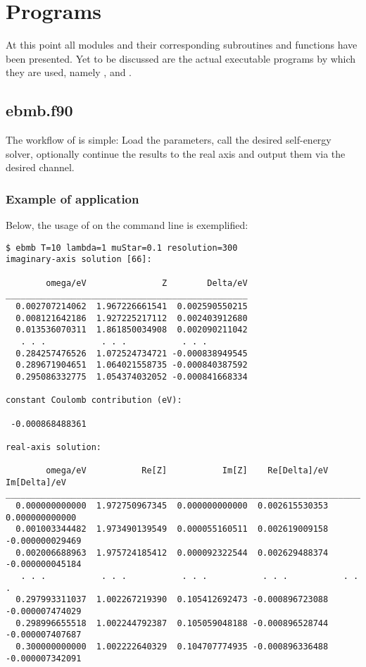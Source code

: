 

\section{Programs}

At this point all modules and their corresponding subroutines and functions have
been presented. Yet to be discussed are the actual executable programs by which
they are used, namely ,  and .

\subsection{ebmb.f90}

The workflow of  is simple: Load the parameters, call the desired
self-energy solver, optionally continue the results to the real axis and output
them via the desired channel.



\subsubsection{Example of application}

Below, the usage of  on the command line is exemplified:
%
\begin{verbatim}
$ ebmb T=10 lambda=1 muStar=0.1 resolution=300
imaginary-axis solution [66]:

        omega/eV               Z        Delta/eV
________________________________________________
  0.002707214062  1.967226661541  0.002590550215
  0.008121642186  1.927225217112  0.002403912680
  0.013536070311  1.861850034908  0.002090211042
   . . .           . . .           . . .
  0.284257476526  1.072524734721 -0.000838949545
  0.289671904651  1.064021558735 -0.000840387592
  0.295086332775  1.054374032052 -0.000841668334

constant Coulomb contribution (eV):

 -0.000868488361

real-axis solution:

        omega/eV           Re[Z]           Im[Z]    Re[Delta]/eV    Im[Delta]/eV
________________________________________________________________________________
  0.000000000000  1.972750967345  0.000000000000  0.002615530353  0.000000000000
  0.001003344482  1.973490139549  0.000055160511  0.002619009158 -0.000000029469
  0.002006688963  1.975724185412  0.000092322544  0.002629488374 -0.000000045184
   . . .           . . .           . . .           . . .           . . .
  0.297993311037  1.002267219390  0.105412692473 -0.000896723088 -0.000007474029
  0.298996655518  1.002244792387  0.105059048188 -0.000896528744 -0.000007407687
  0.300000000000  1.002222640329  0.104707774935 -0.000896336488 -0.000007342091
\end{verbatim}


